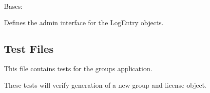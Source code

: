\documentclass[letterpaper,10pt,english]{sphinxmanual}
\begin{document}

\begin{fulllineitems}
\label{api:mousedb.groups.admin.LogEntryAdmin}
Bases: 

Defines the admin interface for the LogEntry objects.

\begin{fulllineitems}
\label{api:mousedb.groups.admin.LogEntryAdmin.fields}
\end{fulllineitems}


\begin{fulllineitems}
\label{api:mousedb.groups.admin.LogEntryAdmin.list_display}
\end{fulllineitems}


\begin{fulllineitems}
\label{api:mousedb.groups.admin.LogEntryAdmin.media}
\end{fulllineitems}


\end{fulllineitems}



\subsection{Test Files}
\label{api:id16}\label{api:module-mousedb.groups.tests}
This file contains tests for the groups application.

These tests will verify generation of a new group and license object.
\end{document}
